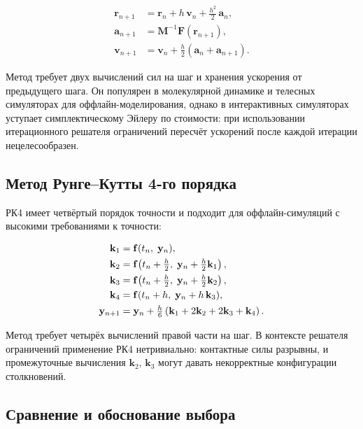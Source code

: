 \begin{align}
  \mathbf{r}_{n+1} &= \mathbf{r}_n + h\,\mathbf{v}_n + \tfrac{h^2}{2}\,\mathbf{a}_n, \label{eq:verlet-r}\\
  \mathbf{a}_{n+1} &= \mathbf{M}^{-1}\mathbf{F}(\mathbf{r}_{n+1}), \\
  \mathbf{v}_{n+1} &= \mathbf{v}_n + \tfrac{h}{2}\left(\mathbf{a}_n + \mathbf{a}_{n+1}\right). \label{eq:verlet-v}
\end{align}

Метод требует двух вычислений сил на шаг и хранения ускорения от предыдущего шага. Он популярен в молекулярной 
динамике и телесных симуляторах для оффлайн-моделирования, однако в интерактивных симуляторах уступает 
симплектическому Эйлеру по стоимости: при использовании итерационного решателя ограничений пересчёт ускорений 
после каждой итерации нецелесообразен.

\subsection{Метод Рунге–Кутты 4-го порядка}

РК4 имеет четвёртый порядок точности и подходит для оффлайн-симуляций с высокими требованиями к точности:

\begin{align}
  \mathbf{k}_1 &= \mathbf{f}(t_n,\; \mathbf{y}_n), \notag\\
  \mathbf{k}_2 &= \mathbf{f}\!\left(t_n + \tfrac{h}{2},\; \mathbf{y}_n + \tfrac{h}{2}\mathbf{k}_1\right), \notag\\
  \mathbf{k}_3 &= \mathbf{f}\!\left(t_n + \tfrac{h}{2},\; \mathbf{y}_n + \tfrac{h}{2}\mathbf{k}_2\right), \notag\\
  \mathbf{k}_4 &= \mathbf{f}(t_n + h,\; \mathbf{y}_n + h\,\mathbf{k}_3), \notag\\
  \mathbf{y}_{n+1} &= \mathbf{y}_n + \tfrac{h}{6}\left(\mathbf{k}_1 + 2\mathbf{k}_2 + 2\mathbf{k}_3 + \mathbf{k}_4\right).
\end{align}

Метод требует четырёх вычислений правой части на шаг. В контексте решателя ограничений применение РК4 
нетривиально: контактные силы разрывны, и промежуточные вычисления $\mathbf{k}_2$, $\mathbf{k}_3$ могут давать 
некорректные конфигурации столкновений.

\subsection{Сравнение и обоснование выбора}

